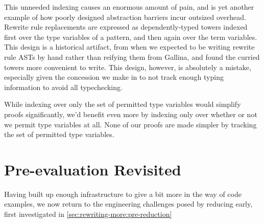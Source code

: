This unneeded indexing causes an enormous amount of pain, and is yet another example of how poorly designed abstraction barriers incur outsized overhead.
Rewrite rule replacements are expressed as dependently-typed towers indexed first over the type variables of a pattern, and then again over the term variables.
This design is a historical artifact, from when we expected to be writing rewrite rule ASTs by hand rather than reifying them from Gallina, and found the curried towers more convenient to write.
This design, however, is absolutely a mistake, especially given the concession we make in  to not track enough typing information to avoid all typechecking.

While indexing over only the set of permitted type variables would simplify proofs significantly, we'd benefit even more by indexing only over whether or not we permit type variables at all.
None of our proofs are made simpler by tracking the set of permitted type variables.
%
%
%

\section{Pre-evaluation Revisited}\label{sec:rewriting-more:pre-reduction-again}

Having built up enough infrastructure to give a bit more in the way of code examples, we now return to the engineering challenges posed by reducing early, first investigated in \autoref{sec:rewriting-more:pre-reduction}

